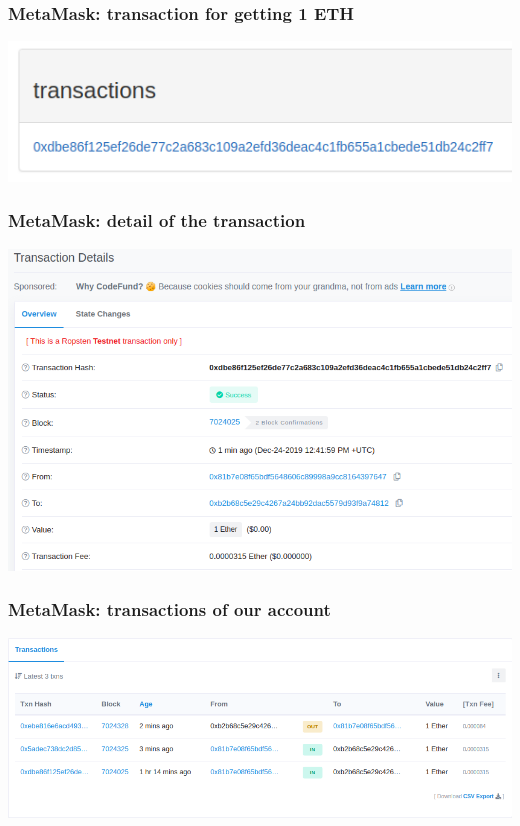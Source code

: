 \documentclass[11pt]{beamer}  %
\begin{document}
\begin{frame}\frametitle{MetaMask: transaction for getting 1 ETH}

  \begin{center}
    \includegraphics[width=\textwidth,clip=false]{pictures/metamask-faucet-transaction.png}
  \end{center}

\end{frame}

\begin{frame}\frametitle{MetaMask: detail of the transaction}

  \begin{center}
    \includegraphics[scale=0.4,clip=false]{pictures/metamask-faucet-transaction-details.png}
  \end{center}

\end{frame}

\begin{frame}\frametitle{MetaMask: transactions of our account}

  \begin{center}
    \includegraphics[width=\textwidth,clip=false]{pictures/metamask-faucet-transactions.png}
  \end{center}

\end{frame}
\end{document}

